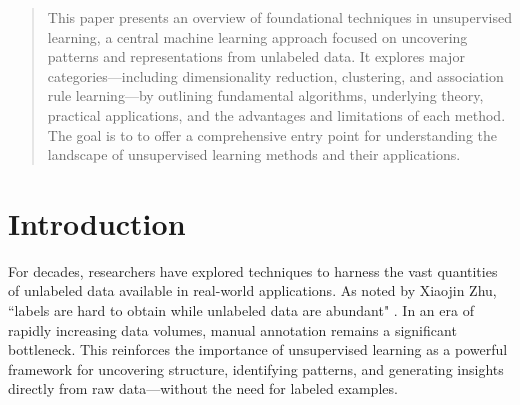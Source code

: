\documentclass[conference]{IEEEtran}
\begin{document}




\maketitle

\begin{abstract}

This paper presents an overview of foundational techniques in unsupervised learning, a central machine learning approach focused on uncovering patterns and representations from unlabeled data. It explores major categories—including dimensionality reduction, clustering, and association rule learning—by outlining fundamental algorithms, underlying theory, practical applications, and the advantages and limitations of each method. The goal is to to offer a comprehensive entry point for understanding the landscape of unsupervised learning methods and their applications.
\end{abstract}





%
\IEEEpeerreviewmaketitle



\section{Introduction}
For decades, researchers have explored techniques to harness the vast quantities of unlabeled data available in real-world applications. As noted by Xiaojin Zhu, ``labels are hard to obtain while unlabeled data are abundant" \cite{intro-article}. In an era of rapidly increasing data volumes, manual annotation remains a significant bottleneck. This reinforces the importance of unsupervised learning as a powerful framework for uncovering structure, identifying patterns, and generating insights directly from raw data—without the need for labeled examples. \\
\end{document}
